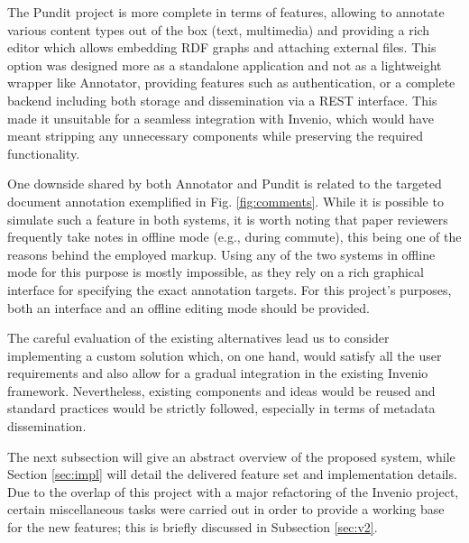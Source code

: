 The Pundit project is more complete in terms of features, allowing to annotate
various content types out of the box (text, multimedia) and providing a rich
editor which allows embedding RDF graphs and attaching external files. This
option was designed more as a standalone application and not as a lightweight
wrapper like Annotator, providing features such as authentication, or a
complete backend including both storage and dissemination via a REST interface.
This made it unsuitable for a seamless integration with Invenio, which would
have meant stripping any unnecessary components while preserving the required
functionality.

One downside shared by both Annotator and Pundit is related to the targeted
document annotation exemplified in Fig. \ref{fig:comments}. While it is
possible to simulate such a feature in both systems, it is worth noting that
paper reviewers frequently take notes in offline mode (e.g., during commute),
this being one of the reasons behind the employed markup. Using any of the two
systems in offline mode for this purpose is mostly impossible, as they rely on
a rich graphical interface for specifying the exact annotation targets. For
this project's purposes, both an interface and an offline editing mode should
be provided.

The careful evaluation of the existing alternatives lead us to consider
implementing a custom solution which, on one hand, would satisfy all the user
requirements and also allow for a gradual integration in the existing Invenio
framework. Nevertheless, existing components and ideas would be reused and
standard practices would be strictly followed, especially in terms of metadata
dissemination.

The next subsection will give an abstract overview of the proposed system,
while Section \ref{sec:impl} will detail the delivered feature set and
implementation details. Due to the overlap of this project with a major
refactoring of the Invenio project, certain miscellaneous tasks were carried
out in order to provide a working base for the new features; this is briefly
discussed in Subsection \ref{sec:v2}.
